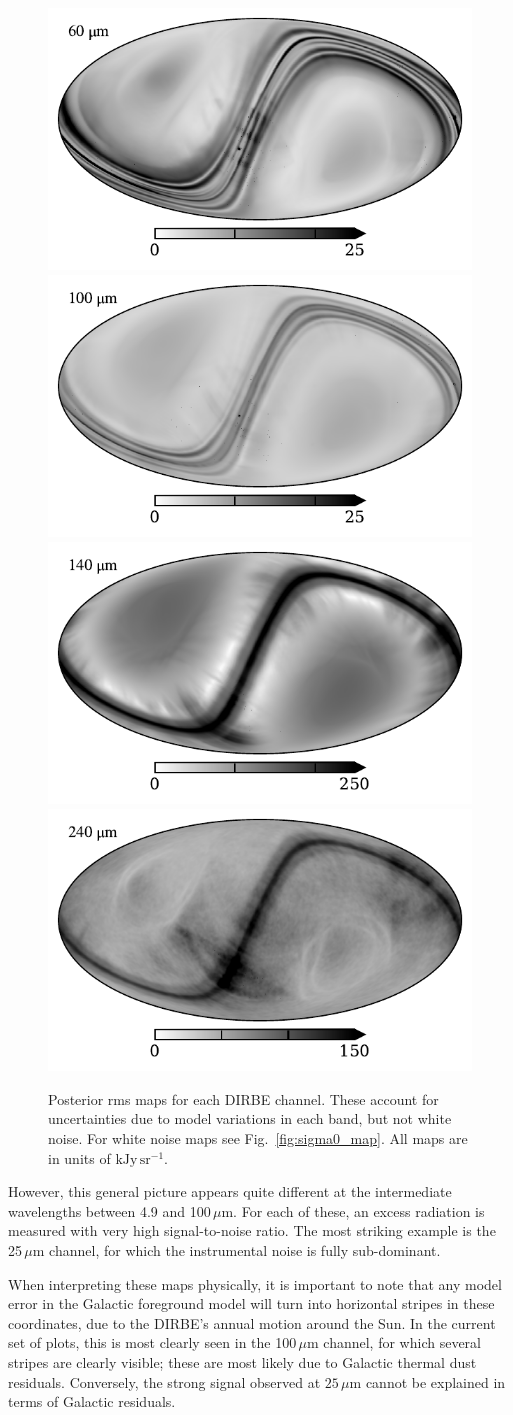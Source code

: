\documentclass{aa}
\begin{document}
\begin{figure}
  \includegraphics[width=0.37\linewidth]{figs/std_07.pdf}
  \includegraphics[width=0.37\linewidth]{figs/std_08.pdf}\\       
  \includegraphics[width=0.37\linewidth]{figs/std_09.pdf}
  \includegraphics[width=0.37\linewidth]{figs/std_10.pdf}       
  \caption{Posterior rms maps for each DIRBE channel. These account
    for uncertainties due to model variations in each band, but not
    white noise. For white noise maps see Fig.~\ref{fig:sigma0_map}.
	All maps are in units of $\mathrm{kJy\,sr^{-1}}$.}
  \label{fig:rms}
\end{figure}


However, this general picture appears quite different at the
intermediate wavelengths between 4.9 and 100$\,\mu$m. For each of
these, an excess radiation is measured with very high signal-to-noise
ratio. The most striking example is the 25\,$\mu$m channel, for which
the instrumental noise is fully sub-dominant.

When interpreting these maps physically, it is important to note that
any model error in the Galactic foreground model will turn into
horizontal stripes in these coordinates, due to the DIRBE's annual
motion around the Sun. In the current set of plots, this is most
clearly seen in the 100$\,\mu$m channel, for which several stripes are
clearly visible; these are most likely due to Galactic thermal dust
residuals. Conversely, the strong signal observed at $25\,\mu$m cannot
be explained in terms of Galactic residuals.
\end{document}
